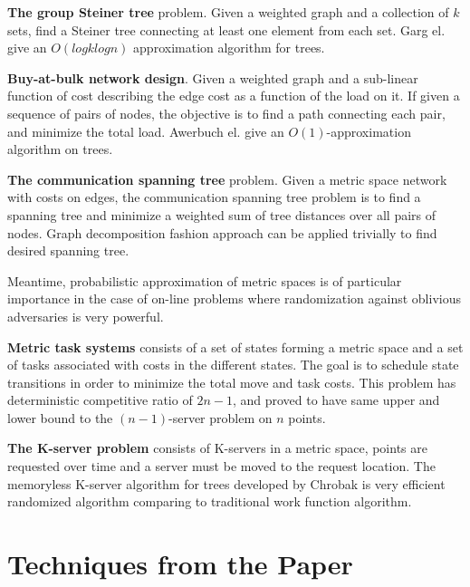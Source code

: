 \documentclass[11pt,twoside, onecolumn]{IEEEtran}
\begin{document}
{\bf The group Steiner tree} problem. Given a weighted graph and a collection of $k$ sets, find
a Steiner tree connecting at least one element from each set. Garg el.\cite{GKR98} give an $O(logklogn)$ approximation 
algorithm for trees.

{\bf Buy-at-bulk network design}. Given a weighted graph and a sub-linear function of cost
describing the edge cost as a function of the load on it. If given a sequence of pairs of nodes,
the objective is to find a path connecting each pair, and minimize the total load. Awerbuch el. \cite{AA97}
give an $O(1)$-approximation algorithm on trees.

{\bf The communication spanning tree} problem\cite{Hu74}. Given a metric space network with costs on edges, the
communication spanning tree problem is to find a spanning tree and minimize a weighted sum of tree distances
over all pairs of nodes. Graph decomposition fashion approach can be applied trivially to find
desired spanning tree.

Meantime, probabilistic approximation of metric spaces is of particular importance in the case of
on-line problems where randomization against oblivious adversaries is very powerful.

{\bf Metric task systems} consists of a set of states forming a metric space and a set of tasks 
associated with costs in the different states. The goal is to schedule state transitions in order to
minimize the total move and task costs. This problem has deterministic competitive ratio of $2n-1$, and
proved to have same upper and lower bound to the $(n-1)$-server problem on $n$ points.\cite{MMS88}

{\bf The K-server problem} consists of K-servers in a metric space, points are requested over time
and a server must be moved to the request location. The memoryless K-server algorithm for trees
developed by Chrobak\cite{CL91} is very efficient randomized algorithm comparing to traditional work function 
algorithm.

\section{Techniques from the Paper}
\end{document}
